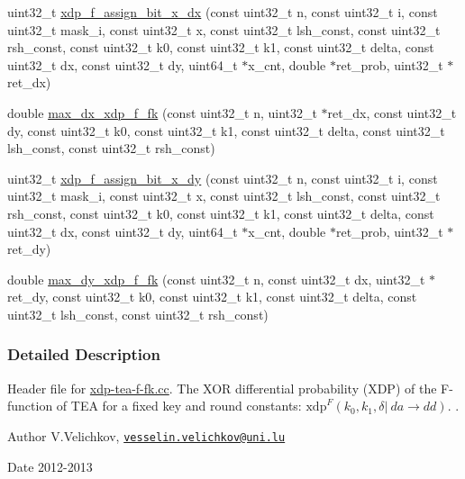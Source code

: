 \begin{DoxyCompactItemize}
\item 
uint32\-\_\-t \hyperlink{xdp-tea-f-fk_8hh_a1115a644e425e49a0302d119e0eb9db0}{xdp\-\_\-f\-\_\-assign\-\_\-bit\-\_\-x\-\_\-dx} (const uint32\-\_\-t n, const uint32\-\_\-t i, const uint32\-\_\-t mask\-\_\-i, const uint32\-\_\-t x, const uint32\-\_\-t lsh\-\_\-const, const uint32\-\_\-t rsh\-\_\-const, const uint32\-\_\-t k0, const uint32\-\_\-t k1, const uint32\-\_\-t delta, const uint32\-\_\-t dx, const uint32\-\_\-t dy, uint64\-\_\-t $\ast$x\-\_\-cnt, double $\ast$ret\-\_\-prob, uint32\-\_\-t $\ast$ret\-\_\-dx)
\item 
double \hyperlink{xdp-tea-f-fk_8hh_af6dac18b8bf6b15b03e2210b186ed2a9}{max\-\_\-dx\-\_\-xdp\-\_\-f\-\_\-fk} (const uint32\-\_\-t n, uint32\-\_\-t $\ast$ret\-\_\-dx, const uint32\-\_\-t dy, const uint32\-\_\-t k0, const uint32\-\_\-t k1, const uint32\-\_\-t delta, const uint32\-\_\-t lsh\-\_\-const, const uint32\-\_\-t rsh\-\_\-const)
\item 
uint32\-\_\-t \hyperlink{xdp-tea-f-fk_8hh_a721c7a6460f6461ab7267f40098734e0}{xdp\-\_\-f\-\_\-assign\-\_\-bit\-\_\-x\-\_\-dy} (const uint32\-\_\-t n, const uint32\-\_\-t i, const uint32\-\_\-t mask\-\_\-i, const uint32\-\_\-t x, const uint32\-\_\-t lsh\-\_\-const, const uint32\-\_\-t rsh\-\_\-const, const uint32\-\_\-t k0, const uint32\-\_\-t k1, const uint32\-\_\-t delta, const uint32\-\_\-t dx, const uint32\-\_\-t dy, uint64\-\_\-t $\ast$x\-\_\-cnt, double $\ast$ret\-\_\-prob, uint32\-\_\-t $\ast$ret\-\_\-dy)
\item 
double \hyperlink{xdp-tea-f-fk_8hh_a14a72673bfe0665f3584a45ed480ead0}{max\-\_\-dy\-\_\-xdp\-\_\-f\-\_\-fk} (const uint32\-\_\-t n, const uint32\-\_\-t dx, uint32\-\_\-t $\ast$ret\-\_\-dy, const uint32\-\_\-t k0, const uint32\-\_\-t k1, const uint32\-\_\-t delta, const uint32\-\_\-t lsh\-\_\-const, const uint32\-\_\-t rsh\-\_\-const)
\end{DoxyCompactItemize}


\subsubsection{\-Detailed \-Description}
\-Header file for \hyperlink{xdp-tea-f-fk_8cc}{xdp-\/tea-\/f-\/fk.\-cc}. \-The \-X\-O\-R differential probability (\-X\-D\-P) of the \-F-\/function of \-T\-E\-A for a fixed key and round constants\-: $\mathrm{xdp}^{F}(k_0, k_1, \delta |~ da \rightarrow dd)$. . \begin{DoxyAuthor}{\-Author}
\-V.\-Velichkov, \href{mailto:vesselin.velichkov@uni.lu}{\tt vesselin.\-velichkov@uni.\-lu} 
\end{DoxyAuthor}
\begin{DoxyDate}{\-Date}
2012-\/2013 
\end{DoxyDate}


